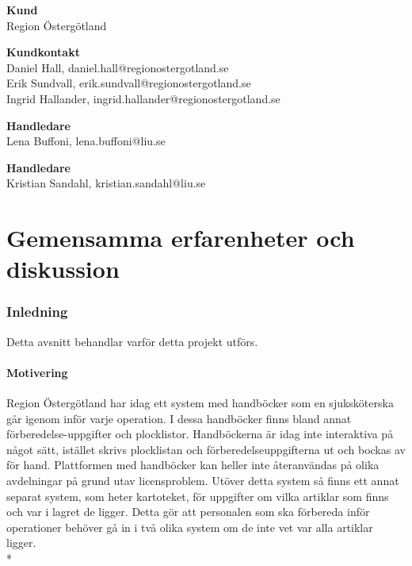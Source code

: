 \documentclass{article}
\begin{document}
\begin{flushleft}
\textbf{Kund} \\ Region Östergötland \\
\end{flushleft}
\begin{flushleft}
\textbf{Kundkontakt} \\ 
Daniel Hall, daniel.hall@regionostergotland.se \\
Erik Sundvall, erik.sundvall@regionostergotland.se \\
Ingrid Hallander, ingrid.hallander@regionostergotland.se \\
\end{flushleft}
\begin{flushleft}
\textbf{Handledare} \\ Lena Buffoni, lena.buffoni@liu.se \\
\end{flushleft}
\begin{flushleft}
\textbf{Handledare} \\ Kristian Sandahl, kristian.sandahl@liu.se \\
\end{flushleft}

\newpage
\tableofcontents
\newpage
{}

\part{Gemensamma erfarenheter och diskussion}

\section{Inledning}
Detta avsnitt behandlar varför detta projekt utförs.
\subsection{Motivering}

Region Östergötland har idag ett system med handböcker som en sjuksköterska går igenom inför varje operation. I dessa handböcker finns bland annat förberedelse-uppgifter och plocklistor. Handböckerna är idag inte interaktiva på något sätt, istället skrivs plocklistan och förberedelse\-uppgifterna ut och bockas av för hand. Plattformen med handböcker kan heller inte återanvändas på olika avdelningar på grund utav licensproblem. Utöver detta system så finns ett annat separat system, som heter kartoteket, för uppgifter om vilka artiklar som finns och var i lagret de ligger. Detta gör att personalen som ska förbereda inför operationer behöver gå in i två olika system om de inte vet var alla artiklar ligger.\\*
\end{document}
